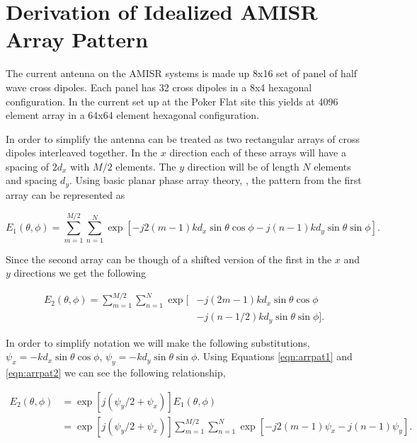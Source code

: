 \chapter{Derivation of Idealized AMISR Array Pattern}
 \label{App:AMISRarr}
\thispagestyle{myheadings}
\graphicspath{{Appendix/Figures/}}

The current antenna on the AMISR systems is made up 8x16 set of panel of half wave cross dipoles. Each panel has 32 cross dipoles in a 8x4 hexagonal configuration. In the current set up at the Poker Flat site this yields at 4096 element array in a 64x64 element hexagonal configuration.

In order to simplify the antenna can be treated as two rectangular arrays of cross dipoles interleaved together. In the $x$ direction each of these arrays will have a spacing of $2d_x$ with $M/2$ elements. The $y$ direction will be of length $N$ elements and spacing $d_y$. Using basic planar phase array theory, \cite{Balanis:2005:ATA:1208379}, the pattern from the first array can be represented as 

\begin{equation}
\label{eqn:arrpat1}
E_1(\theta,\phi) =\displaystyle \sum_{m=1}^{M/2}\sum_{n=1}^{N} \exp\left[-j2\left(m-1\right)kd_x\sin\theta\cos\phi -j\left(n-1\right) k d_y\sin\theta\sin\phi\right].
\end{equation}

\noindent Since the second array can be though of a shifted version of the first in the $x$ and $y$ directions we get the following

\begin{equation}
\label{eqn:arrpat2}
\begin{split}
E_2(\theta,\phi) =\displaystyle \sum_{m=1}^{M/2}\sum_{n=1}^{N} \exp[&-j\left(2m-1\right)kd_x\sin\theta\cos\phi \\ &-j\left(n-1/2\right) k d_y\sin\theta\sin\phi].
\end{split}
\end{equation}

In order to simplify notation we will make the following substitutions, $\psi_x = -k d_x\sin\theta\cos\phi$, $\psi_y = -k d_y\sin\theta\sin\phi$. Using Equations \ref{eqn:arrpat1} and \ref{eqn:arrpat2} we can see the following relationship,

\begin{equation}
\label{eqn:arrpateqn}
\begin{split}
E_2(\theta,\phi)  &=  \exp\left[j(\psi_y/2 + \psi_x)\right] E_1(\theta,\phi)  \\&= \exp\left[j(\psi_y/2 + \psi_x)\right]  \displaystyle \sum_{m=1}^{M/2}\sum_{n=1}^{N}  \exp\left[-j2\left(m-1\right) \psi_x -j\left(n-1\right) \psi_y\right].
\end{split}
\end{equation}

